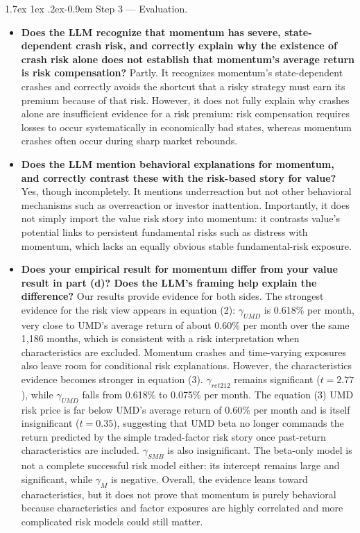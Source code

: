 \documentclass[11pt]{article}
\makeatletter
\renewcommand\paragraph{\@startsection{paragraph}{4}{0pt}%
  {1.7ex \@plus 1ex \@minus .2ex}{-0.9em}%
  {\normalfont\bfseries\normalsize\color{psink}}}
\newenvironment{tight}
  {\begin{itemize}\setlength{\itemsep}{3pt}\setlength{\parskip}{0pt}%
   \setlength{\topsep}{3pt}\setlength{\leftmargini}{1.4em}}
  {\end{itemize}}
\makeatother
\begin{document}
\paragraph{Step 3 --- Evaluation.}
\begin{tight}
  \item \textbf{Does the LLM recognize that momentum has severe, state-dependent crash
  risk, and correctly explain why the existence of crash risk alone does not establish
  that momentum's average return is risk compensation?} Partly. It recognizes momentum's
  state-dependent crashes and correctly avoids the shortcut that a risky strategy must
  earn its premium because of that risk. However, it does not fully explain why crashes
  alone are insufficient evidence for a risk premium: risk compensation requires losses to
  occur systematically in economically bad states, whereas momentum crashes often occur
  during sharp market rebounds.
  \item \textbf{Does the LLM mention behavioral explanations for momentum, and correctly
  contrast these with the risk-based story for value?} Yes, though incompletely. It
  mentions underreaction but not other behavioral mechanisms such as overreaction or
  investor inattention. Importantly, it does not simply import the value risk story into
  momentum: it contrasts value's potential links to persistent fundamental risks such as
  distress with momentum, which lacks an equally obvious stable fundamental-risk exposure.
  \item \textbf{Does your empirical result for momentum differ from your value result in
  part (d)? Does the LLM's framing help explain the difference?} Our results provide
  evidence for both sides. The strongest evidence for the risk view appears in equation
  (2): $\gamma_{UMD}$ is 0.618\% per month, very close to UMD's average return of about
  0.60\% per month over the same 1,186 months, which is consistent with a risk
  interpretation when characteristics are excluded. Momentum crashes and time-varying
  exposures also leave room for conditional risk explanations. However, the
  characteristics evidence becomes stronger in equation (3). $\gamma_{ret212}$ remains
  significant ($t = 2.77$), while $\gamma_{UMD}$ falls from 0.618\% to 0.075\% per month. The equation
  (3) UMD risk price is far below UMD's average return of 0.60\% per month and is itself
  insignificant ($t = 0.35$), suggesting that UMD beta no longer commands the return
  predicted by the simple traded-factor risk story once past-return characteristics are
  included. $\gamma_{SMB}$
  is also insignificant. The beta-only model is not a complete successful risk model
  either: its intercept remains large and significant, while $\gamma_M$ is negative.
  Overall, the evidence leans toward characteristics, but it does not prove that momentum
  is purely behavioral because characteristics and factor exposures are highly correlated
  and more complicated risk models could still matter.


\end{tight}
\end{document}
